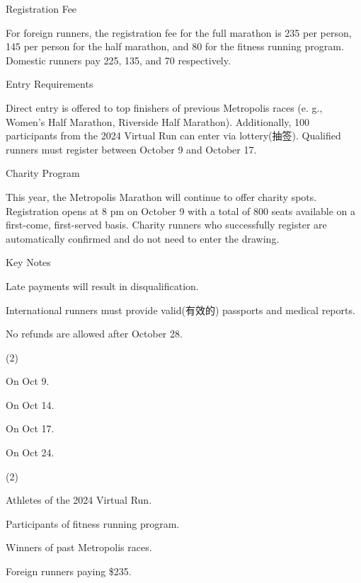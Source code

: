 \documentclass{英语试卷}
\begin{document}
\par Registration Fee\par
\par For foreign runners, the registration fee for the full marathon is 235 per person, 145 per person for the half marathon, and 80 for the fitness running program. Domestic runners pay 225, 135, and 70 respectively.\par
\par Entry Requirements\par
\par Direct entry is offered to top finishers of previous Metropolis races (e. g., Women's Half Marathon, Riverside Half Marathon). Additionally, 100 participants from the 2024 Virtual Run can enter via lottery(抽签). Qualified runners must register between October 9 and October 17.\par
\par Charity Program\par
\par This year, the Metropolis Marathon will continue to offer charity spots. Registration opens at 8 pm on October 9 with a total of 800 seats available on a first-come, first-served basis. Charity runners who successfully register are automatically confirmed and do not need to enter the drawing.\par
\par Key Notes\par
\par Late payments will result in disqualification.\par
\par International runners must provide valid(有效的) passports and medical reports.\par
\par No refunds are allowed after October 28.\par
{}
\begin{choices}(2)
  \item On Oct 9.
  \item On Oct 14.
  \item On Oct 17.
  \item On Oct 24.
\end{choices}
\begin{choices}(2)
  \item Athletes of the 2024 Virtual Run.
  \item Participants of fitness running program.
  \item Winners of past Metropolis races.
  \item Foreign runners paying \$235.
\end{choices}
\end{document}
